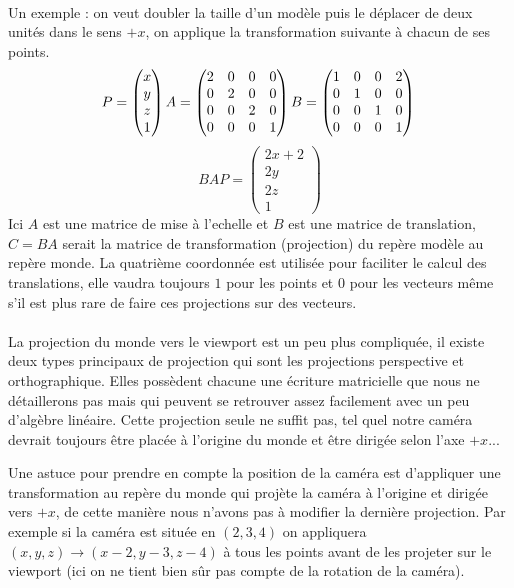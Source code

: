 \documentclass[11pt]{article} %
\begin{document}
\paragraph{}
Un exemple : on veut doubler la taille d'un modèle puis le déplacer de deux unités dans le sens $+x$, on applique la transformation suivante à chacun de ses points.
$$
	P = \begin{pmatrix}x\\y\\z\\1\end{pmatrix}\\
	A = \begin{pmatrix}2&0&0&0\\0&2&0&0\\0&0&2&0\\0&0&0&1\end{pmatrix}\\
	B = \begin{pmatrix}1&0&0&2\\0&1&0&0\\0&0&1&0\\0&0&0&1\end{pmatrix}\\
$$
$$
	BAP = \begin{pmatrix}2x+2\\2y\\2z\\1\end{pmatrix}
$$
Ici $A$ est une matrice de mise à l'echelle et $B$ est une matrice de translation, $C=BA$ serait la matrice de transformation (projection) du repère modèle au repère monde. La quatrième coordonnée est utilisée pour faciliter le calcul des translations, elle vaudra toujours $1$ pour les points et $0$ pour les vecteurs même s'il est plus rare de faire ces projections sur des vecteurs.

\paragraph{}
La projection du monde vers le viewport est un peu plus compliquée, il existe deux types principaux de projection qui sont les projections perspective et orthographique. Elles possèdent chacune une écriture matricielle que nous ne détaillerons pas mais qui peuvent se retrouver assez facilement avec un peu d'algèbre linéaire. Cette projection seule ne suffit pas, tel quel notre caméra devrait toujours être placée à l'origine du monde et être dirigée selon l'axe $+x$...
\par
Une astuce pour prendre en compte la position de la caméra est d'appliquer une transformation au repère du monde qui projète la caméra à l'origine et dirigée vers $+x$, de cette manière nous n'avons pas à modifier la dernière projection. Par exemple si la caméra est située en $(2,3,4)$ on appliquera $(x,y,z)\rightarrow(x-2,y-3,z-4)$ à tous les points avant de les projeter sur le viewport (ici on ne tient bien sûr pas compte de la rotation de la caméra).
\end{document}
